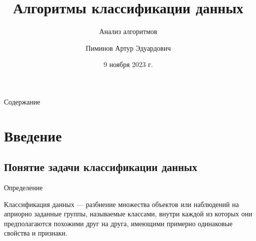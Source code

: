 \documentclass{beamer}
\title %
{Алгоритмы классификации данных}
\subtitle
{Анализ алгоритмов} %
\author[Пиминов А.Э.] %
{Пиминов Артур Эдуардович}
\institute[НГУ] %
{
  Группа 23224\\
  Факультет информационных технологий\\
  Новосибирский государственный университет
}
\date[09.11.2023] %
{9 ноября 2023 г.}
\begin{document}
\begin{frame}
  \titlepage
\end{frame}

\begin{frame}{Содержание}
  \tableofcontents
\end{frame}




\section{Введение}

\subsection{Понятие задачи классификации данных}

\begin{frame}{Определение}
  \begin{definition} 
   Классификация данных — разбиение множества объектов или наблюдений на априорно заданные группы, называемые классами, внутри каждой из которых они предполагаются похожими друг на друга, имеющими примерно одинаковые свойства и признаки. 
  \end{definition}
\end{frame}
\end{document}

